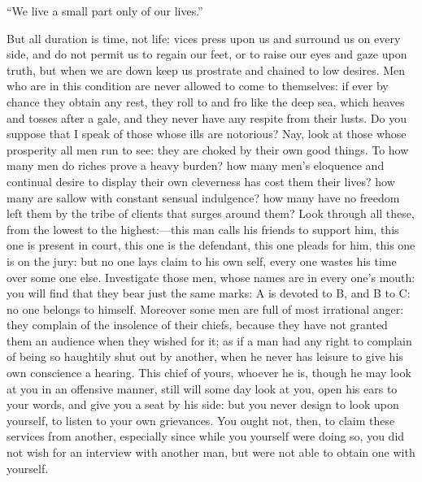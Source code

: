 \documentclass[12pt]{article}
\begin{document}
“We live a small part only of our lives.”

But all duration is time, not life: vices press upon us and surround us on every side, and do not permit us to regain our feet, or to raise our eyes and gaze upon truth, but when we are down keep us prostrate and chained to low desires. Men who are in this condition are never allowed to come to themselves: if ever by chance they obtain any rest, they roll to and fro like the deep sea, which heaves and tosses after a gale, and they never have any respite from their lusts. Do you suppose that I speak of those whose ills are notorious? Nay, look at those whose prosperity all men run to see: they are choked by their own good things. To how many men do riches prove a heavy burden? how many men’s eloquence and continual desire to display their own cleverness has cost them their lives? how many are sallow with constant sensual indulgence? how many have no freedom left them by the tribe of clients that surges around them? Look through all these, from the lowest to the highest:—this man calls his friends to support him, this one is present in court, this one is the defendant, this one pleads for him, this one is on the jury: but no one lays claim to his own self, every one wastes his time over some one else. Investigate those men, whose names are in every one’s mouth: you will find that they bear just the same marks: A is devoted to B, and B to C: no one belongs to himself. Moreover some men are full of most irrational anger: they complain of the insolence of their chiefs, because they have not granted them an audience when they wished for it; as if a man had any right to complain of being so haughtily shut out by another, when he never has leisure to give his own conscience a hearing. This chief of yours, whoever he is, though he may look at you in an offensive manner, still will some day look at you, open his ears to your words, and give you a seat by his side: but you never design to look upon yourself, to listen to your own grievances. You ought not, then, to claim these services from another, especially since while you yourself were doing so, you did not wish for an interview with another man, but were not able to obtain one with yourself.
\end{document}

